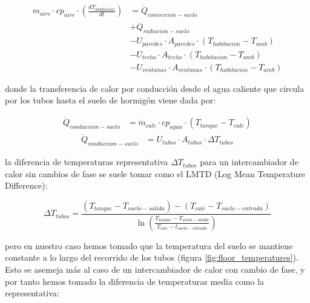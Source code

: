 \begin{align} \label{eq:room_energy_conservation}
	m_{aire} \cdot cp_{aire} \cdot \left( \frac{dT_{habitacion}}{dt} \right) & = \dot{Q}_{conveccion-suelo} \nonumber                                     \\
	                                                                         & + \dot{Q}_{radiacion-suelo} \nonumber                                      \\
	                                                                         & - U_{paredes} \cdot A_{paredes} \cdot (T_{habitacion} - T_{amb}) \nonumber \\
	                                                                         & - U_{techo} \cdot A_{techo} \cdot (T_{habitacion} - T_{amb}) \nonumber     \\
	                                                                         & - U_{ventanas} \cdot A_{ventanas} \cdot (T_{habitacion} - T_{amb})
\end{align}

donde la transferencia de calor por conducción desde el agua caliente que
circula por los tubos hasta el suelo de hormigón viene dada por:

\begin{align} \label{eq:q_conduccion_1}
	\dot{Q}_{conduccion-suelo} & = \dot{m}_{cale} \cdot cp_{agua} \cdot (T_{tanque} - T_{cale})
\end{align}
\begin{align} \label{eq:q_conduccion_2}
	\dot{Q}_{conduccion-suelo} & = U_{tubos} \cdot A_{tubos} \cdot \Delta T_{tubos}
\end{align}

la diferencia de temperaturas representativa $\Delta T_{tubos}$ para un
intercambiador de calor sin cambios de fase se suele tomar como el LMTD (Log
Mean Temperature Difference):

\begin{equation} \label{eq:lmtd}
	\Delta T_{tubos} = \frac{(T_{tanque} - T_{suelo-salida}) - (T_{cale} - T_{suelo-entrada})}{\ln\left(\frac{T_{tanque} - T_{suelo-salida}}{T_{cale} - t_{suelo-entrada} } \right) }
\end{equation}

pero en nuestro caso hemos tomado que la temperatura del suelo se mantiene
constante a lo largo del recorrido de los tubos (figura
\ref{fig:floor_temperatures}). Esto se asemeja más al caso de un intercambiador
de calor con cambio de fase, y por tanto hemos tomado la diferencia de
temperaturas media como la representativa:

